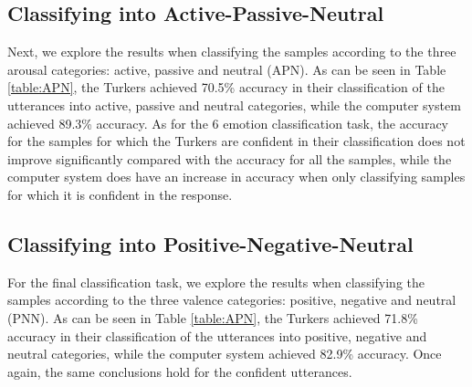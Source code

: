 \documentclass{article}
\begin{document}
\subsection{Classifying into Active-Passive-Neutral }
Next, we explore the results when classifying the samples according to the three arousal categories: active, passive and neutral (APN). As can be seen in Table \ref{table:APN}, the Turkers achieved 70.5\% accuracy in their classification of the utterances into active, passive and neutral categories, while the computer system achieved 89.3\% accuracy. As for the 6 emotion classification task, the accuracy for the samples for which the Turkers are confident in their classification does not improve significantly compared with the accuracy for all the samples, while the computer system does have an increase in accuracy when only classifying samples for which it is confident in the response.
\subsection{Classifying into Positive-Negative-Neutral }
For the final classification task, we explore the results when classifying the samples according to the three valence categories: positive, negative and neutral (PNN). As can be seen in Table \ref{table:APN}, the Turkers achieved 71.8\% accuracy in their classification of the utterances into positive, negative and neutral categories, while the computer system achieved 82.9\% accuracy. Once again, the same conclusions hold for the confident utterances.	
\end{document}
